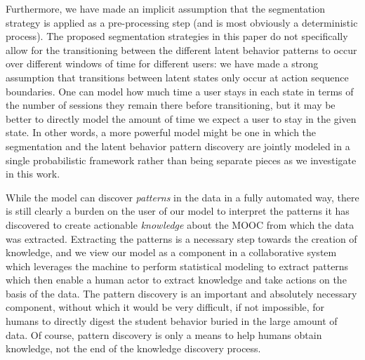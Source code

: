 Furthermore, we have made an implicit assumption that the segmentation
strategy is applied as a pre-processing step (and is most obviously a
deterministic process). The proposed segmentation strategies in this paper
do not specifically allow for the transitioning between the different
latent behavior patterns to occur over different windows of time for
different users: we have made a strong assumption that transitions between
latent states only occur at action sequence boundaries. One can model how
much time a user stays in each state in terms of the number of sessions
they remain there before transitioning, but it may be better to directly
model the amount of time we expect a user to stay in the given state.  In
other words, a more powerful model might be one in which the segmentation
and the latent behavior pattern discovery are jointly modeled in a single
probabilistic framework rather than being separate pieces as we investigate
in this work.

While the model can discover \emph{patterns} in the data in a fully
automated way, there is still clearly a burden on the user of our model to
interpret the patterns it has discovered to create actionable
\emph{knowledge} about the MOOC from which the data was extracted.
Extracting the patterns is a necessary step towards the creation of
knowledge, and we view our model as a component in a collaborative system
which leverages the machine to perform statistical modeling to extract
patterns which then enable a human actor to extract knowledge and take
actions on the basis of the data. The pattern discovery is an important and
absolutely necessary component, without which it would be very difficult,
if not impossible, for humans to directly digest the student behavior
buried in the large amount of data.  Of course, pattern discovery is only a
means to help humans obtain knowledge, not the end of the knowledge
discovery process.
